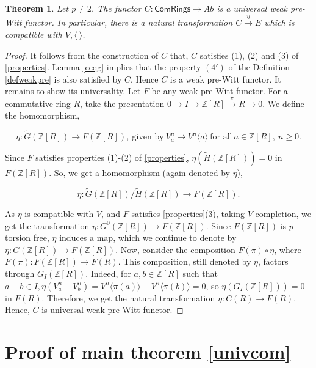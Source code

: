 \documentclass[10pt]{amsart}
\theoremstyle{plain}
\newtheorem{theorem}[thm]{Theorem}
\theoremstyle{definition}
\renewcommand{\tilde}{\widetilde}
\newcommand{\Z}{{\mathbb Z}}
\newcommand{\ab}[1]{\langle {#1} \rangle}
\newcommand{\Com}{{\mathsf{ComRings}}}
\begin{document}
\begin{theorem}\label{universalweakprewitt} Let $p\neq 2$. The functor $C: \Com \to Ab$ is a universal weak pre-Witt functor. In particular, there is a natural transformation $C\xrightarrow{\eta} E$ which is compatible with $V, \ab{ \ }$.
\end{theorem}
\begin{proof} It follows from the construction of $C$ that, $C$ satisfies (1), (2) and (3) of \ref{properties}. Lemma \ref{ceqg} implies that the property $(4')$ of the Definition \ref{defweakpre} is also satisfied by $C$. Hence $C$ is a weak pre-Witt functor. It remains to show its universality. Let $F$ be any weak pre-Witt functor. For a commutative ring $R$, take the presentation $0 \to I \to \Z[R] \xrightarrow{\pi} R \to 0$. We define the homomorphism, 

$$\eta: \tilde{G}(\Z[R]) \to F(\Z[R]), \ \text{given by} \  V^n_{a}  \mapsto V^n\ab{a} \ \text{for all} \  a \in \Z[R], \ n \geq 0.$$ 

\vspace{1mm}
\noindent Since $F$ satisfies properties (1)-(2) of \ref{properties}, $\eta(\tilde{H}(\Z[R]))=0$ in $F(\Z[R])$. So, we get a homomorphism (again denoted by $\eta$),

 $$\eta:\tilde{G}(\Z[R])/\tilde{H}(\Z[R]) \to F(\Z[R]).$$ 
 
\vspace{1mm}
\noindent As $\eta$ is compatible with $V$, and $F$ satisfies \ref{properties}(3), taking $V$-completion, we get the transformation 
 $\eta: G^0(\Z[R]) \to F(\Z[R])$. Since $F(\Z[R])$ is $p$-torsion free, $\eta$ induces a map, which we continue to denote by $\eta : G(\Z[R])\to F(\Z[R])$. Now, consider the composition  $F(\pi) \circ \eta$, where $F(\pi): F(\Z[R]) \to F(R)$. This composition, still denoted by $\eta$, factors through $G_I(\Z[R])$. Indeed, for $a, b \in \Z[R]$ such that $a-b \in I, \eta(V^n_a-V^n_b)= V^n\ab{\pi(a)}-V^n\ab{\pi(b)} = 0$, so $\eta(G_I(\Z[R])) = 0$ in $F(R).$ Therefore, we get the natural transformation $\eta: C(R) \to F(R).$ Hence, $C$ is universal weak pre-Witt functor.
 \end{proof}
\vspace{1mm}
\section{Proof of main theorem \ref{univcom}}
\end{document}
